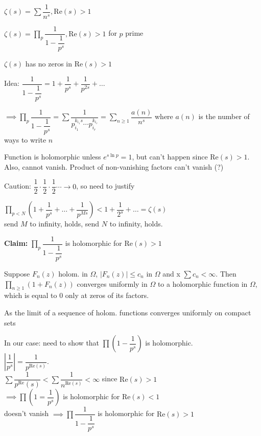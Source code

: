 \documentclass[10pt]{article}
\renewcommand{\Re}{\text{Re}}
\begin{document}
$\zeta(s) = \sum \dfrac{1}{n^s}, \Re(s) > 1$

\begin{defn}
   $\zeta(s) = \prod\limits_{p} \dfrac{1}{1-{\dfrac{1}{p^s}}}, \Re(s) > 1$ for $p$ prime
\end{defn}

\begin{cor}
   $\zeta(s)$ has no zeros in $\Re(s) > 1$
\end{cor}

Idea: $\dfrac{1}{1-\dfrac{1}{p^s}} = 1 + \dfrac{1}{p^s} + \dfrac{1}{p^{2s}} + \ldots$

$\implies \prod\limits_{p} \dfrac{1}{1-{\dfrac{1}{p^s}}} = \sum \dfrac{1}{p_{i_1}^{k_{i_1} s}\cdots p_{i_r}^{k_{i_r}}} = \sum\limits_{n \geq 1} \dfrac{a(n)}{n^s}$ where $a(n)$ is the number of ways to write $n$

Function is holomorphic unless $e^{s\ln p} = 1$, but can't happen since $\Re(s) > 1$. Also, cannot vanish. Product of non-vanishing factors can't vanish (?)

Caution: $\dfrac{1}{2} \cdot\dfrac{1}{2} \cdot\dfrac{1}{2} \cdots \to 0$, so need to justify

$\prod\limits_{p < N} (1 + \dfrac{1}{p^s} + \ldots + \dfrac{1}{p^{Ms}}) < 1 + \dfrac{1}{2^s} + \ldots = \zeta(s)$\\
send $M$ to infinity, holds, send $N$ to infinity, holds. %

\textbf{Claim:} $\prod\limits_{p} \dfrac{1}{1-{\dfrac{1}{p^s}}}$ is holomorphic for $\Re(s) > 1$

\begin{prop}
   Suppose $F_n(z)$ holom. in $\Omega$, $|F_n(z)| \leq c_n$ in $\Omega$ and x $\sum c_n < \infty$. Then $\prod_{n \geq 1} (1 + F_n(z))$ converges uniformly in $\Omega$ to a holomorphic function in $\Omega$, which is equal to 0 only at zeros of its factors.
\end{prop}
As the limit of a sequence of holom. functions converges uniformly on compact sets %

In our case: need to show that $\prod (1 - \dfrac{1}{p^s})$ is holomorphic. \\
$\left|\dfrac{1}{p^s}\right| = \dfrac{1}{p^{\Re(s)}}$.\\
$\sum \dfrac{1}{p^\Re(s)} < \sum \dfrac{1}{n^{\Re(s)}} < \infty$ since $\Re(s) > 1$\\
$\implies  \prod(1 = \dfrac{1}{p^s})$ is holomorphic for $\Re(s) < 1$\\
doesn't vanish $\implies \prod \dfrac{1}{1-\dfrac{1}{p^s}}$ is holomorphic for $\Re(s) > 1$
\end{document}
